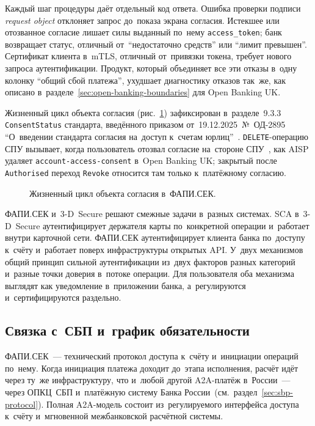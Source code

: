 Каждый шаг процедуры даёт отдельный код ответа. Ошибка проверки подписи
\textit{request object} отклоняет запрос до~показа экрана согласия. Истекшее
или отозванное согласие лишает силы выданный по~нему \texttt{access\_token}; банк возвращает статус,
отличный от~\enquote{недостаточно средств} или \enquote{лимит превышен}.
Сертификат клиента в~mTLS, отличный от~привязки токена, требует нового
запроса аутентификации. Продукт, который объединяет все эти отказы в~одну колонку
\enquote{общий сбой платежа}, ухудшает диагностику отказов так~же, как описано
в~разделе~\ref{sec:open-banking-boundaries} для Open Banking UK.

Жизненный цикл объекта согласия (рис.~\ref{fig:fapi-sec-consent-lifecycle})
зафиксирован в~разделе~9.3.3 \texttt{ConsentStatus} стандарта, введённого
приказом от~19.12.2025~№~ОД-2895 \enquote{О~введении стандарта согласия
на~доступ к~счетам юрлиц}~\cite{cbr-od-2895}. \texttt{DELETE}-операцию СПУ
вызывает, когда пользователь отозвал согласие на~стороне СПУ~\cite{cbr-od-2895},
как AISP удаляет \texttt{account-access-consent} в~Open Banking UK; закрытый
после \texttt{Authorised} переход \texttt{Revoke} относится там только
к~платёжному согласию.

\begin{figure}[htbp]
  \centering
  \caption{Жизненный цикл объекта согласия в~ФАПИ.СЕК.}\label{fig:fapi-sec-consent-lifecycle}
\end{figure}

ФАПИ.СЕК и~3-D~Secure решают смежные задачи в~разных системах.
SCA в~3-D~Secure аутентифицирует держателя карты
по~конкретной операции и~работает внутри карточной сети. ФАПИ.СЕК
аутентифицирует клиента банка по~доступу к~счёту и~работает поверх
инфраструктуры открытых API. У~двух механизмов общий принцип сильной
аутентификации из~двух факторов разных категорий и~разные точки доверия
в~потоке операции. Для пользователя оба механизма выглядят как уведомление
в~приложении банка, а~регулируются и~сертифицируются раздельно.

\subsection*{Связка с~СБП и~график обязательности}

ФАПИ.СЕК~--- технический протокол доступа к~счёту и~инициации операций по~нему.
Когда инициация платежа доходит до~этапа исполнения, расчёт идёт через ту~же
инфраструктуру, что и~любой другой A2A-платёж в~России~--- через ОПКЦ~СБП
и~платёжную систему Банка России~(см.~раздел~\ref{sec:sbp-protocol}). Полная
A2A-модель состоит из~регулируемого интерфейса доступа
к~счёту и~мгновенной межбанковской расчётной системы.

